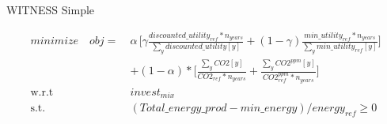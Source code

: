 \documentclass{article}
\begin{document}
WITNESS Simple

\begin{equation}
\begin{aligned}
minimize \quad  obj =~
& \alpha\,\Bigg[\gamma \frac{discounted\_utility_{ref}*n_{years}}{\sum_{y}discounted\_utility[y]}
+ (1 - \gamma) \frac{min\_utility_{ref}*n_{years}}{\sum_{y}min\_utility_{ref}[y]} \Bigg] \\
& +(1-\alpha)*\Bigg[\frac{\sum_{y}CO2[y]}{CO2_{ref}*n_{years}} + \frac{\sum_{y}CO2^{ppm}[y]}{CO2^{ppm}_{ref}*n_{years}} \Bigg]
\\
\textrm{w.r.t} \quad & invest_{mix} \\               
\textrm{s.t.} \quad & (Total\_energy\_prod - min\_energy)/energy_{ref} \geq 0\\
\\
\end{aligned}
\end{equation}\\
\end{document}
